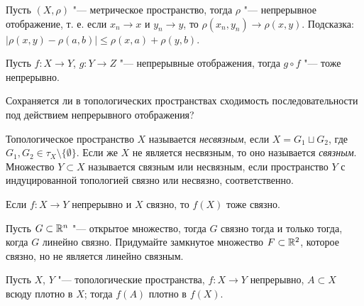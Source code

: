 \documentclass[main]{subfiles}
\begin{document}
\begin{exercise}
  Пусть \( (X, \rho) \) "--- метрическое пространство,
  тогда \( \rho \) "--- непрерывное отображение,
  т. е. если \( x_n \to x \) и \( y_n \to y \),
  то \( \rho(x_n, y_n) \to \rho(x, y) \).
  Подсказка: \( |\rho(x, y) - \rho(a, b)| \le
  \rho(x, a) + \rho(y, b) \).
\end{exercise}

\begin{exercise}
  Пусть \( f : X \to Y \), \( g : Y \to Z \) "--- непрерывные
  отображения, тогда \( g \circ f \) "--- тоже непрерывно.
\end{exercise}

\begin{exercise}
  Сохраняется ли в топологических пространствах сходимость
  последовательности под действием непрерывного отображения?
\end{exercise}

\begin{definition}
  Топологическое пространство \( X \) называется \emph{несвязным},
  если \( X = G_1 \sqcup G_2 \), где
  \( G_1, G_2 \in \tau_X \setminus \{ \emptyset \} \).
  Если же \( X \) не является несвязным, то оно
  называется \emph{связным}. Множество \( Y \subset X \) называется
  связным или несвязным, если пространство
  \( Y \) с индуцированной топологией связно или несвязно,
  соответственно.
\end{definition}

\begin{exercise}
  Если \( f : X \to Y \) непрерывно и \( X \) связно,
  то \( f(X) \) тоже связно.
\end{exercise}

\begin{exercise}
  Пусть \( G \subset \mathbb{R}^n \) "--- открытое множество, тогда
  \( G \) связно тогда и только тогда, когда \( G \)
  линейно связно. Придумайте замкнутое множество \( F \subset \mathbb{R}^2 \),
  которое связно, но не является линейно связным.
\end{exercise}

\begin{exercise}
  Пусть \( X \), \( Y \) "--- топологические пространства,
  \( f : X \to Y \) непрерывно, \( A \subset X \) всюду
  плотно в \( X \); тогда \( f(A) \) плотно в \( f(X) \).
\end{exercise}
\end{document}
